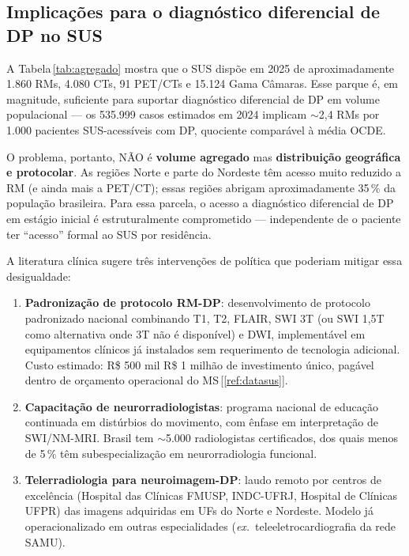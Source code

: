 \documentclass[12pt,a4paper,oneside]{article}
\begin{document}
\subsection{Implicações para o diagnóstico diferencial de DP no SUS}

A Tabela\,\ref{tab:agregado} mostra que o SUS dispõe em 2025 de
aproximadamente 1.860 RMs, 4.080 CTs, 91 PET/CTs e 15.124 Gama
Câmaras. Esse parque é, em magnitude, suficiente para suportar
diagnóstico diferencial de DP em volume populacional — os 535.999
casos estimados em 2024 implicam $\sim$2,4 RMs por 1.000 pacientes
SUS-acessíveis com DP, quociente comparável à média OCDE.

O problema, portanto, NÃO é \textbf{volume agregado} mas
\textbf{distribuição geográfica e protocolar}. As regiões Norte e
parte do Nordeste têm acesso muito reduzido a RM (e ainda mais a
PET/CT); essas regiões abrigam aproximadamente 35\,\% da
população brasileira. Para essa parcela, o acesso a diagnóstico
diferencial de DP em estágio inicial é estrutural\-mente
comprometido — independente de o paciente ter ``acesso'' formal ao
SUS por residência.

A literatura clínica sugere três intervenções de política que
poderiam mitigar essa desigualdade:

\begin{enumerate}
\item \textbf{Padronização de protocolo RM-DP}: desenvolvimento de
protocolo padronizado nacional combinando T1, T2, FLAIR, SWI 3T
(ou SWI 1,5T como alternativa onde 3T não é disponível) e DWI,
implementável em equipamentos clínicos já instalados sem
requerimento de tecnologia adicional. Custo estimado: R\$ 500 mil
\textendash{} R\$ 1 milhão de investimento único, pagável dentro
de orçamento operacional do MS\,[\ref{ref:datasus}].
\item \textbf{Capacitação de neurorradiologistas}: programa
nacional de educação continuada em distúrbios do movimento, com
ênfase em interpretação de SWI/NM-MRI. Brasil tem
$\sim$5.000 radiologistas certificados, dos quais menos de 5\,\%
têm subespecialização em neurorradiologia funcional.
\item \textbf{Telerradiologia para neuroimagem-DP}: laudo remoto por
centros de excelência (Hospital das Clínicas FMUSP, INDC-UFRJ,
Hospital de Clínicas UFPR) das imagens adquiridas em UFs do Norte
e Nordeste. Modelo já operacionalizado em outras especialidades
(\textit{ex.}\ teleeletrocardiografia da rede SAMU).
\end{enumerate}
\end{document}
